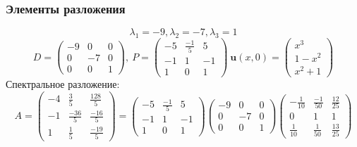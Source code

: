 \documentclass[a4paper,14pt]{article}
\begin{document}
    \subsubsection{Элементы разложения}
    \begin{equation}
    \lambda_1 = -9,    \lambda_2 = -7,    \lambda_3 = 1
    \end{equation}
    \vspace{0.5cm}
    \begin{equation}
    D = \left( \begin{array}{ccc}{-9} & {0} & {0} \\ {0} & {-7} & {0} \\ {0} & {0} & {1}\end{array}\right),\ P = \left( \begin{array}{ccc}{-5} & {\frac{-1}{5}} & {5} \\ {-1} & {1} & {-1} \\ {1} & {0} & {1}\end{array}\right) \ \mathbf{u}(x, 0)=\left( \begin{array}{c}{x^{3}} \\ {1-x^{2}} \\ {x^{2}+1}\end{array}\right)
    \end{equation}
    \vspace{0.5cm}
    Спектральное разложение:
    \vspace{0.5cm}
    \begin{equation}
A = \left( \begin{array}{ccc}{-4} & {\frac{3}{5}} & {\frac{128}{5}} \\ {-1} & {\frac{-36}{5}} & {\frac{-16}{5}} \\ {1} & {\frac{1}{5}} & {\frac{-19}{5}}\end{array}\right) = \left( \begin{array}{ccc}{-5} & {\frac{-1}{5}} & {5} \\ {-1} & {1} & {-1} \\ {1} & {0} & {1}\end{array}\right) \left( \begin{array}{ccc}{-9} & {0} & {0} \\ {0} & {-7} & {0} \\ {0} & {0} & {1}\end{array}\right) \left( \begin{array}{ccc}{-\frac{1}{10}} & {\frac{-1}{50}} & {\frac{12}{25}} \\ {0} & {1} & {1} \\ {\frac{1}{10}} & {\frac{1}{50}} & {\frac{13}{25}}\end{array}\right)
\end{equation}
\end{document}
